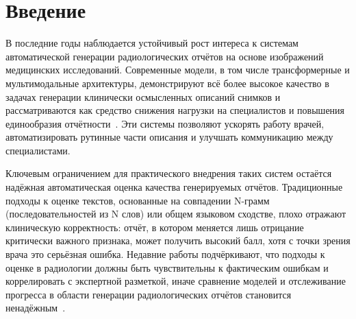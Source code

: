 \section*{Введение} 








В последние годы наблюдается устойчивый рост интереса к системам автоматической генерации радиологических отчётов на основе изображений медицинских исследований. Современные модели, в том числе трансформерные и мультимодальные архитектуры, демонстрируют всё более высокое качество в задачах генерации клинически осмысленных описаний снимков и рассматриваются как средство снижения нагрузки на специалистов и повышения единообразия отчётности~\cite{pmlr-v158-endo21a,yu2023evaluating,mamdouh2025advancements}. Эти системы позволяют ускорять работу врачей, автоматизировать рутинные части описания и улучшать коммуникацию между специалистами.

Ключевым ограничением для практического внедрения таких систем остаётся надёжная автоматическая оценка качества генерируемых отчётов. Традиционные подходы к оценке текстов, основанные на совпадении N-грамм (последовательностей из N слов) или общем языковом сходстве, плохо отражают клиническую корректность: отчёт, в котором меняется лишь отрицание критически важного признака, может получить высокий балл, хотя с точки зрения врача это серьёзная ошибка. Недавние работы подчёркивают, что подходы к оценке в радиологии должны быть чувствительны к фактическим ошибкам и коррелировать с экспертной разметкой, иначе сравнение моделей и отслеживание прогресса в области генерации радиологических отчётов становится ненадёжным~\cite{yu2023evaluating}.

